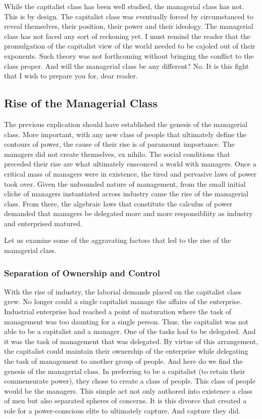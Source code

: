 \documentclass[12pt]{article}
\begin{document}
While the capitalist class has been well studied, the managerial class has not.
This is by design.
The capitalist class was eventually forced by circumstanced to reveal themselves, their position, their power and their ideology.
The managerial class has not faced any sort of reckoning yet.
I must remind the reader that the promulgation of the capitalist view of the world needed to be cajoled out of their exponents.
Such theory was not forthcoming without bringing the conflict to the class proper.
And will the managerial class be any different?
No.
It is this fight that I wish to prepare you for, dear reader.

\subsection{Rise of the Managerial Class}
The previous explication should have established the genesis of the managerial class.
More important, with any new class of people that ultimately define the contours of power, the cause of their rise is of paramount importance.
The managers did not create themselves, ex nihilo.
The social conditions that preceded their rise are what ultimately ensconced a world with managers.
Once a critical mass of managers were in existence, the tired and pervasive laws of power took over.
Given the unbounded nature of management, from the small initial cliche of managers instantiated across industry came the rise of the managerial class.
From there, the algebraic laws that constitute the calculus of power demanded that managers be delegated more and more responsibliity as industry and enterprised matured.

Let us examine some of the aggravating factors that led to the rise of the managerial class.

\subsubsection{Separation of Ownership and Control}
With the rise of industry, the laborial demands placed on the capitalist class grew.
No longer could a single capitalist manage the affairs of the enterprise.
Industrial enterprise had reached a point of maturation where the task of management was too daunting for a single person.
Thus, the capitalist was not able to be a capitalist and a manager.
One of the tasks had to be delegated.
And it was the task of management that was delegated.
By virtue of this arrangement, the capitalist could maintain their ownership of the enterprise while delegating the task of management to another group of people.
And here do we find the genesis of the managerial class.
In preferring to be a capitalist (to retain their commensurate power), they chose to create a class of people.
This class of people would be the managers.
This simple act not only authored into existence a class of men but also separated spheres of concerns.
It is this divorce that created a role for a power-conscious elite to ultimately capture.
And capture they did.
\end{document}
